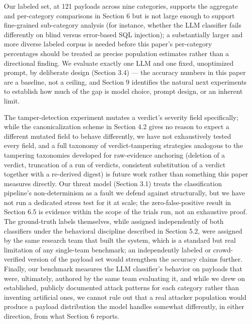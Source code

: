 \documentclass[journal,10pt,twocolumn]{IEEEtran}
\begin{document}
Our labeled set, at 121 payloads across nine categories, supports the aggregate and per-category comparisons in Section 6 but is not large enough to support fine-grained sub-category analysis (for instance, whether the LLM classifier fails differently on blind versus error-based SQL injection); a substantially larger and more diverse labeled corpus is needed before this paper's per-category percentages should be treated as precise population estimates rather than a directional finding. We evaluate exactly one LLM and one fixed, unoptimized prompt, by deliberate design (Section 3.4) --- the accuracy numbers in this paper are a baseline, not a ceiling, and Section 9 identifies the natural next experiments to establish how much of the gap is model choice, prompt design, or an inherent limit.

The tamper-detection experiment mutates a verdict's severity field specifically; while the canonicalization scheme in Section 4.2 gives no reason to expect a different mutated field to behave differently, we have not exhaustively tested every field, and a full taxonomy of verdict-tampering strategies analogous to the tampering taxonomies developed for raw-evidence anchoring (deletion of a verdict, truncation of a run of verdicts, consistent substitution of a verdict together with a re-derived digest) is future work rather than something this paper measures directly. Our threat model (Section 3.1) treats the classification pipeline's non-determinism as a fault we defend against structurally, but we have not run a dedicated stress test for it at scale; the zero-false-positive result in Section 6.5 is evidence within the scope of the trials run, not an exhaustive proof. The ground-truth labels themselves, while assigned independently of both classifiers under the behavioral discipline described in Section 5.2, were assigned by the same research team that built the system, which is a standard but real limitation of any single-team benchmark; an independently labeled or crowd-verified version of the payload set would strengthen the accuracy claims further. Finally, our benchmark measures the LLM classifier's behavior on payloads that were, ultimately, authored by the same team evaluating it, and while we drew on established, publicly documented attack patterns for each category rather than inventing artificial ones, we cannot rule out that a real attacker population would produce a payload distribution the model handles somewhat differently, in either direction, from what Section 6 reports.
\end{document}
